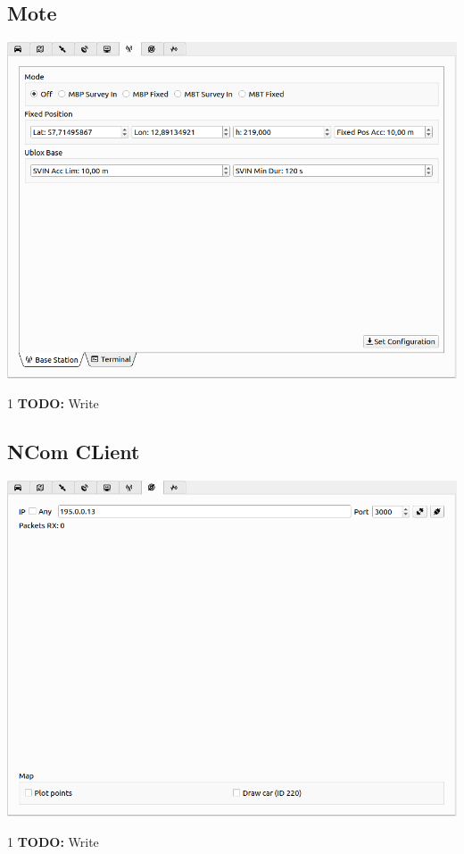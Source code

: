 \documentclass[12pt]{article} %
\def\printtodos{0}
\newcommand{\todo}[1]{
  \if\printtodos1
      {\color{red} \textbf{TODO:} #1}
  \fi}
\begin{document}
\subsection{Mote}
\noindent\begin{minipage}{0.5\linewidth}
\noindent \includegraphics[width=\textwidth]{./screens/mote.png}
\end{minipage}
\begin{minipage}{0.5\linewidth}
  \todo{Write}
\end{minipage}

\subsection{NCom CLient}

\noindent\begin{minipage}{0.5\linewidth}
\noindent \includegraphics[width=\textwidth]{./screens/ncom_client.png}
\end{minipage}
\begin{minipage}{0.5\linewidth}
  \todo{Write}
\end{minipage}
\end{document}
